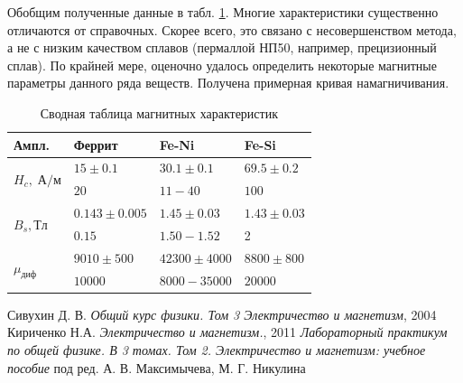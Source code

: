 \documentclass[a4paper]{article}
\begin{document}
Обобщим полученные данные в табл. \ref{tab:my-table}.
Многие характеристики существенно отличаются от справочных. Скорее всего, это связано с несовершенством метода, а не с низким качеством сплавов (пермаллой НП50, например, прецизионный сплав). По крайней мере, оценочно удалось определить некоторые магнитные параметры данного ряда веществ. Получена примерная кривая намагничивания.

\begin{table}[h]
	\centering
	\begin{tabular}{|l|l|l|l|}
		\hline
		Ампл.                          & Феррит           & Fe-Ni           & Fe-Si          \\ \hline
		\multirow{2}{*}{$H_c, \; А/м$} & $15\pm 0.1$      & $30.1\pm 0.1$   & $69.5\pm 0.2$  \\ \cline{2-4} 
		& $20$             & $11 - 40$       & $100$          \\ \hline
		\multirow{2}{*}{$B_s, Тл$}     & $0.143\pm 0.005$ & $1.45\pm 0.03$  & $1.43\pm 0.03$ \\ \cline{2-4} 
		& $0.15$           & $1.50 - 1.52$   & 2              \\ \hline
		\multirow{2}{*}{$\mu_{диф}$}   & $9010\pm 500$    & $42300\pm 4000$ & $8800\pm 800$  \\ \cline{2-4} 
		& $10000$          & $8000 - 35000$  & $20000$        \\ \hline
	\end{tabular}
	\caption{Сводная таблица магнитных характеристик}
	\label{tab:my-table}
\end{table}

\newpage
\begin{thebibliography}{9}
	 Сивухин Д. В. \emph{Общий курс физики. Том 3 Электричество и магнетизм}, 2004
	 Кириченко Н.А. \emph{Электричество и магнетизм.}, 2011
	 \emph{Лабораторный практикум по общей физике. В 3 томах. Том 2. Электричество и магнетизм: учебное пособие} под ред. А. В. Максимычева, М. Г. Никулина
\end{thebibliography}
\end{document}
